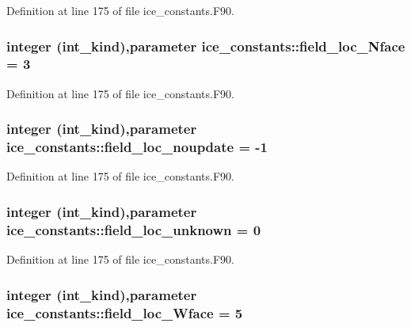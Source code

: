 Definition at line 175 of file ice\_\-constants.F90.\hypertarget{namespaceice__constants_ac47ad33ed33a4dae49cf6e50c05efd06}{
\subsubsection[{field\_\-loc\_\-Nface}]{\setlength{\rightskip}{0pt plus 5cm}integer (int\_\-kind),parameter {\bf ice\_\-constants::field\_\-loc\_\-Nface} = 3}}
\label{namespaceice__constants_ac47ad33ed33a4dae49cf6e50c05efd06}


Definition at line 175 of file ice\_\-constants.F90.\hypertarget{namespaceice__constants_a369a7f2a079cc86d38882b8247aaa0b0}{
\subsubsection[{field\_\-loc\_\-noupdate}]{\setlength{\rightskip}{0pt plus 5cm}integer (int\_\-kind),parameter {\bf ice\_\-constants::field\_\-loc\_\-noupdate} = -\/1}}
\label{namespaceice__constants_a369a7f2a079cc86d38882b8247aaa0b0}


Definition at line 175 of file ice\_\-constants.F90.\hypertarget{namespaceice__constants_a58c70d55a68b1df0f5ffa50c44454925}{
\subsubsection[{field\_\-loc\_\-unknown}]{\setlength{\rightskip}{0pt plus 5cm}integer (int\_\-kind),parameter {\bf ice\_\-constants::field\_\-loc\_\-unknown} = 0}}
\label{namespaceice__constants_a58c70d55a68b1df0f5ffa50c44454925}


Definition at line 175 of file ice\_\-constants.F90.\hypertarget{namespaceice__constants_ad97a4cfce80f3acb3657f497e459e6fb}{
\subsubsection[{field\_\-loc\_\-Wface}]{\setlength{\rightskip}{0pt plus 5cm}integer (int\_\-kind),parameter {\bf ice\_\-constants::field\_\-loc\_\-Wface} = 5}}
\label{namespaceice__constants_ad97a4cfce80f3acb3657f497e459e6fb}


